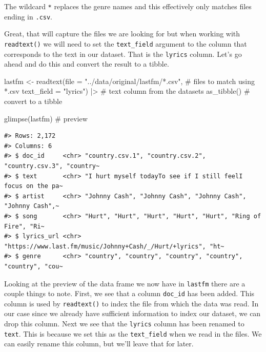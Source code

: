 \documentclass[
  letterpaper,
]{latex/krantz}
\newenvironment{Shaded}{\begin{snugshade}}{\end{snugshade}}
\newcommand{\AttributeTok}[1]{\textcolor[rgb]{0.40,0.45,0.13}{#1}}
\newcommand{\CommentTok}[1]{\textcolor[rgb]{0.37,0.37,0.37}{#1}}
\newcommand{\FunctionTok}[1]{\textcolor[rgb]{0.28,0.35,0.67}{#1}}
\newcommand{\NormalTok}[1]{\textcolor[rgb]{0.00,0.23,0.31}{#1}}
\newcommand{\OtherTok}[1]{\textcolor[rgb]{0.00,0.23,0.31}{#1}}
\newcommand{\SpecialCharTok}[1]{\textcolor[rgb]{0.37,0.37,0.37}{#1}}
\newcommand{\StringTok}[1]{\textcolor[rgb]{0.13,0.47,0.30}{#1}}
\begin{document}
The wildcard \texttt{*} replaces the genre names and this effectively
only matches files ending in \texttt{.csv}.

Great, that will capture the files we are looking for but when working
with \texttt{readtext()} we will need to set the \texttt{text\_field}
argument to the column that corresponds to the text in our dataset. That
is the \texttt{lyrics} column. Let's go ahead and do this and convert
the result to a tibble.

\begin{Shaded}
\begin{Highlighting}[]
\NormalTok{lastfm }\OtherTok{\textless{}{-}} 
  \FunctionTok{readtext}\NormalTok{(}\AttributeTok{file =} \StringTok{"../data/original/lastfm/*.csv"}\NormalTok{, }\CommentTok{\# files to match using *.csv}
           \AttributeTok{text\_field =} \StringTok{"lyrics"}\NormalTok{) }\SpecialCharTok{|\textgreater{}} \CommentTok{\# text column from the datasets}
  \FunctionTok{as\_tibble}\NormalTok{() }\CommentTok{\# convert to a tibble}

\FunctionTok{glimpse}\NormalTok{(lastfm) }\CommentTok{\# preview}
\end{Highlighting}
\end{Shaded}

\begin{verbatim}
#> Rows: 2,172
#> Columns: 6
#> $ doc_id     <chr> "country.csv.1", "country.csv.2", "country.csv.3", "country~
#> $ text       <chr> "I hurt myself todayTo see if I still feelI focus on the pa~
#> $ artist     <chr> "Johnny Cash", "Johnny Cash", "Johnny Cash", "Johnny Cash",~
#> $ song       <chr> "Hurt", "Hurt", "Hurt", "Hurt", "Hurt", "Ring of Fire", "Ri~
#> $ lyrics_url <chr> "https://www.last.fm/music/Johnny+Cash/_/Hurt/+lyrics", "ht~
#> $ genre      <chr> "country", "country", "country", "country", "country", "cou~
\end{verbatim}

Looking at the preview of the data frame we now have in \texttt{lastfm}
there are a couple things to note. First, we see that a column
\texttt{doc\_id} has been added. This column is used by
\texttt{readtext()} to index the file from which the data was read. In
our case since we already have sufficient information to index our
dataset, we can drop this column. Next we see that the \texttt{lyrics}
column has been renamed to \texttt{text}. This is because we set this as
the \texttt{text\_field} when we read in the files. We can easily rename
this column, but we'll leave that for later.
\end{document}
